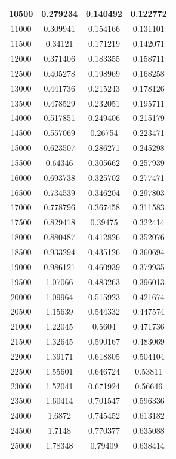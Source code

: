 \documentclass{article}
\begin{document}
\begin{longtable}{|c|c|c|c|}
			10500  &	0.279234	&  0.140492	       &  0.122772   \\ \hline
			11000  &	0.309941	&  0.154166	       &  0.131101   \\ \hline
			11500  &	0.34121	    &  0.171219	       &  0.142071   \\ \hline
			12000  &	0.371406	&  0.183355	       &  0.158711   \\ \hline
			12500  &	0.405278	&  0.198969	       &  0.168258   \\ \hline
			13000  &	0.441736	&  0.215243	       &  0.178126   \\ \hline
			13500  &	0.478529	&  0.232051	       &  0.195711   \\ \hline
			14000  &	0.517851	&  0.249406	       &  0.215179   \\ \hline
			14500  &	0.557069	&  0.26754	       &  0.223471   \\ \hline
			15000  &	0.623507	&  0.286271	       &  0.245298   \\ \hline
			15500  &	0.64346	    &  0.305662	       &  0.257939   \\ \hline
			16000  &	0.693738	&  0.325702	       &  0.277471   \\ \hline
			16500  &	0.734539	&  0.346204	       &  0.297803   \\ \hline
			17000  &	0.778796	&  0.367458	       &  0.311583   \\ \hline
			17500  &	0.829418	&  0.39475	       &  0.322414   \\ \hline
			18000  &	0.880487	&  0.412826	       &  0.352076   \\ \hline
			18500  &	0.933294	&  0.435126	       &  0.360694   \\ \hline
			19000  &	0.986121	&  0.460939	       &  0.379935   \\ \hline
			19500  &	1.07066	    &  0.483263	       &  0.396013   \\ \hline
			20000  &	1.09964	    &  0.515923	       &  0.421674   \\ \hline
			20500  &	1.15639	    &  0.544332	       &  0.447574   \\ \hline
			21000  &	1.22045	    &  0.5604	       &  0.471736   \\ \hline
			21500  &	1.32645	    &  0.590167	       &  0.483069   \\ \hline
			22000  &	1.39171	    &  0.618805	       &  0.504104   \\ \hline
			22500  &	1.55601	    &  0.646724	       &  0.53811   \\ \hline
			23000  &	1.52041	    &  0.671924	       &  0.56646   \\ \hline
			23500  &	1.60414	    &  0.701547	       &  0.596336   \\ \hline
			24000  &	1.6872	    &  0.745452	       &  0.613182   \\ \hline
			24500  &	1.7148	    &  0.770377	       &  0.635088   \\ \hline
			25000  &	1.78348	    &  0.79409	       &  0.638414   \\ \hline
		\end{longtable}
\end{document}
